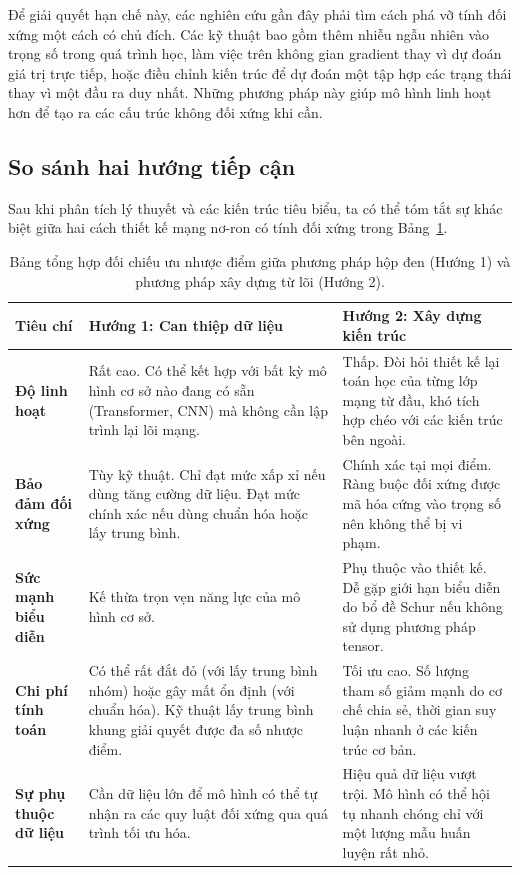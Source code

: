 Để giải quyết hạn chế này, các nghiên cứu gần đây phải tìm cách phá vỡ tính đối xứng một cách có chủ đích. Các kỹ thuật bao gồm thêm nhiễu ngẫu nhiên vào trọng số trong quá trình học, làm việc trên không gian gradient thay vì dự đoán giá trị trực tiếp, hoặc điều chỉnh kiến trúc để dự đoán một tập hợp các trạng thái thay vì một đầu ra duy nhất. Những phương pháp này giúp mô hình linh hoạt hơn để tạo ra các cấu trúc không đối xứng khi cần.

\subsection{So sánh hai hướng tiếp cận}
\label{subsec:comparison}

Sau khi phân tích lý thuyết và các kiến trúc tiêu biểu, ta có thể tóm tắt sự khác biệt giữa hai cách thiết kế mạng nơ-ron có tính đối xứng trong Bảng~\ref{tab:comparison-approaches}.

\begin{table}[H]
\centering
\small
\renewcommand{\arraystretch}{1.3}
\begin{tabular}{p{} p{} p{}}
\toprule
\textbf{Tiêu chí} & \textbf{Hướng 1: Can thiệp dữ liệu} & \textbf{Hướng 2: Xây dựng kiến trúc} \\
\midrule
\textbf{Độ linh hoạt} & Rất cao. Có thể kết hợp với bất kỳ mô hình cơ sở nào đang có sẵn (Transformer, CNN) mà không cần lập trình lại lõi mạng. & Thấp. Đòi hỏi thiết kế lại toán học của từng lớp mạng từ đầu, khó tích hợp chéo với các kiến trúc bên ngoài. \\
\textbf{Bảo đảm đối xứng} & Tùy kỹ thuật. Chỉ đạt mức xấp xỉ nếu dùng tăng cường dữ liệu. Đạt mức chính xác nếu dùng chuẩn hóa hoặc lấy trung bình. & Chính xác tại mọi điểm. Ràng buộc đối xứng được mã hóa cứng vào trọng số nên không thể bị vi phạm. \\
\textbf{Sức mạnh biểu diễn} & Kế thừa trọn vẹn năng lực của mô hình cơ sở. & Phụ thuộc vào thiết kế. Dễ gặp giới hạn biểu diễn do bổ đề Schur nếu không sử dụng phương pháp tensor. \\
\textbf{Chi phí tính toán} & Có thể rất đắt đỏ (với lấy trung bình nhóm) hoặc gây mất ổn định (với chuẩn hóa). Kỹ thuật lấy trung bình khung giải quyết được đa số nhược điểm. & Tối ưu cao. Số lượng tham số giảm mạnh do cơ chế chia sẻ, thời gian suy luận nhanh ở các kiến trúc cơ bản. \\
\textbf{Sự phụ thuộc dữ liệu} & Cần dữ liệu lớn để mô hình có thể tự nhận ra các quy luật đối xứng qua quá trình tối ưu hóa. & Hiệu quả dữ liệu vượt trội. Mô hình có thể hội tụ nhanh chóng chỉ với một lượng mẫu huấn luyện rất nhỏ. \\
\bottomrule
\end{tabular}
\caption{Bảng tổng hợp đối chiếu ưu nhược điểm giữa phương pháp hộp đen (Hướng 1) và phương pháp xây dựng từ lõi (Hướng 2).}
\label{tab:comparison-approaches}
\end{table}

